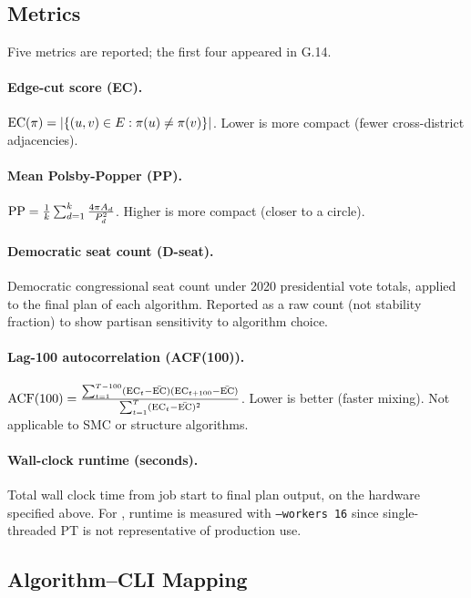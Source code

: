 \subsection{Metrics}

Five metrics are reported; the first four appeared in G.14.

\paragraph{Edge-cut score (EC).}
$\mathrm{EC}(\pi) = |\{(u,v) \in E : \pi(u) \neq \pi(v)\}|$.
Lower \ec{} is more compact (fewer cross-district adjacencies).

\paragraph{Mean Polsby-Popper (PP).}
$\mathrm{PP} = \frac{1}{k} \sum_{d=1}^k \frac{4\pi A_d}{P_d^2}$.
Higher \pp{} is more compact (closer to a circle).

\paragraph{Democratic seat count (D-seat).}
Democratic congressional seat count under 2020 presidential vote totals,
applied to the final plan of each algorithm.
Reported as a raw count (not stability fraction) to show partisan sensitivity
to algorithm choice.

\paragraph{Lag-100 autocorrelation (ACF(100)).}
$\mathrm{ACF}(100) = \frac{\sum_{t=1}^{T-100}(\mathrm{EC}_t - \bar{\mathrm{EC}})(\mathrm{EC}_{t+100}
- \bar{\mathrm{EC}})}{\sum_{t=1}^T (\mathrm{EC}_t - \bar{\mathrm{EC}})^2}$.
Lower is better (faster mixing). Not applicable to SMC or structure algorithms.

\paragraph{Wall-clock runtime (seconds).}
Total wall clock time from job start to final plan output, on the hardware
specified above.
For \pt{}, runtime is measured with \texttt{--workers 16} since single-threaded
PT is not representative of production use.

\subsection{Algorithm--CLI Mapping}

